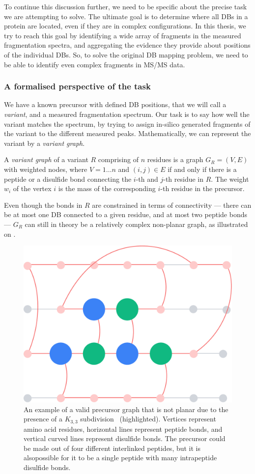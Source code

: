 To continue this discussion further, we need to be specific about the precise task we are attempting to solve. The ultimate goal is to determine where all DBs in a protein are located, even if they are in complex configurations. In this thesis, we try to reach this goal by identifying a wide array of fragments in the measured fragmentation spectra, and aggregating the evidence they provide about positions of the individual DBs. So, to solve the original DB mapping problem, we need to be able to identify even complex fragments in MS/MS data.

\subsubsection{A formalised perspective of the task}

We have a known precursor with defined DB positions, that we will call a \emph{variant}, and a measured fragmentation spectrum. Our task is to say how well the variant matches the spectrum, by trying to assign in-silico generated fragments of the variant to the different measured peaks. Mathematically, we can represent the variant by a \emph{variant graph}.

\begin{defn}
  A \emph{variant graph} of a variant \(R\) comprising of \(n\) residues is a graph \(G_R = (V, E)\) with weighted nodes, where \(V  = 1\ldots n\) and \((i, j) \in E\) if and only if there is a peptide or a disulfide bond connecting  the \(i\)-th and \(j\)-th residue in \(R\). The weight \(w_i\) of the vertex \(i\) is the mass of the corresponding \(i\)-th residue in the precursor.
\end{defn}

Even though the bonds in \(R\) are constrained in terms of connectivity --- there can be at most one DB connected to a given residue, and at most two peptide bonds --- \(G_R\) can still in theory be a relatively complex non-planar graph, as illustrated on .

\begin{figure}
  \centering
  \includegraphics[width=0.5\linewidth]{img/nonplanar.pdf}
  \caption{An example of a valid precursor graph that is not planar due to the presence of a \(K_{3, 3}\) subdivision~\cite{kuratowski1930probleme} (highlighted). Vertices represent amino acid residues, horizontal lines represent peptide bonds, and vertical curved lines represent disulfide bonds. The precursor could be made out of four different interlinked peptides, but it is alsopossible for it to be a single peptide with many intrapeptide disulfide bonds.}\label{fig:nonplanar}
\end{figure}


